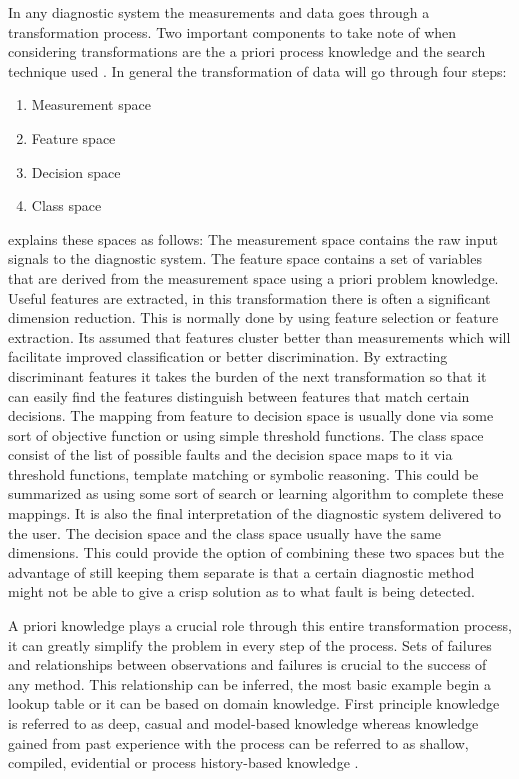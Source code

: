 In any diagnostic system the measurements and data goes through a transformation process. Two important components to take note of when considering transformations are the a priori process knowledge and the search technique used \cite{venkatasubramanian2003review}. In general the transformation of data will go through four steps:
\begin{enumerate}
	\item Measurement space
	\item Feature space
	\item Decision space
	\item Class space	
\end{enumerate}

\cite{venkatasubramanian2003review} explains these spaces as follows:
The measurement space contains the raw input signals to the diagnostic system. The feature space contains a set of variables that are derived from the measurement space using a priori problem knowledge. Useful features are extracted, in this transformation there is often a significant dimension reduction. This is normally done by using feature selection or feature extraction. Its assumed that features cluster better than measurements which will facilitate improved classification or better discrimination. By extracting discriminant features it takes the burden of the next transformation so that it can easily find the features distinguish between features that match certain decisions.
The mapping from feature to decision space is usually done via some sort of objective function or using simple threshold functions. The class space consist of the list of possible faults and the decision space maps to it via threshold functions, template matching or symbolic reasoning. This could be summarized as using some sort of search or learning algorithm to complete these mappings. It is also the final interpretation of the diagnostic system delivered to the user. The decision space and the class space usually have the same dimensions. This could provide the option of combining these two spaces but the advantage of still keeping them separate is that a certain diagnostic method might not be able to give a crisp solution as to what fault is being detected.

A priori knowledge plays a crucial role through this entire transformation process, it can greatly simplify the problem in every step of the process. Sets of failures and relationships between observations and failures is crucial to the success of any method. This relationship can be inferred, the most basic example begin a lookup table or it can be based on domain knowledge. First principle knowledge is referred to as deep, casual and model-based knowledge whereas knowledge gained from past experience with the process can be referred to as shallow, compiled, evidential or process history-based knowledge \cite{venkatasubramanian2003review}.

